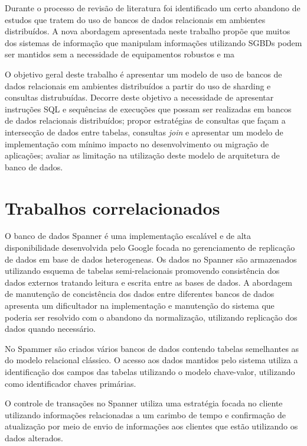\documentclass[12pt, a4paper]{article}
\begin{document}
Durante o processo de revisão de literatura foi identificado um certo abandono de estudos que tratem
do uso de bancos de dados relacionais em ambientes distribuídos. A nova abordagem apresentada neste
trabalho propõe que muitos dos sistemas de informação que manipulam informações utilizando SGBDs podem
ser mantidos sem a necessidade de equipamentos robustos e ma

O objetivo geral deste trabalho é apresentar um modelo de uso de bancos de dados relacionais em ambientes distribuídos a 
partir do uso de sharding e consultas distrubuídas. Decorre deste objetivo a necessidade de apresentar instruções SQL e 
sequências de execuções que possam ser realizadas em bancos de dados relacionais distribuídos; propor estratégias 
de consultas que façam a intersecção de dados entre tabelas, consultas \textit{join} e apresentar
um modelo de implementação com mínimo impacto no desenvolvimento ou migração de aplicações;
avaliar as limitação na utilização deste modelo de arquitetura de banco de dados.



\section{Trabalhos correlacionados}

O banco de dados Spanner é uma implementação escalável e de alta disponibilidade desenvolvida pelo Google
focada no gerenciamento de replicação de dados em base de dados heterogeneas. Os dados no Spanner são
armazenados utilizando esquema de tabelas semi-relacionais promovendo consistência dos dados externos tratando
leitura e escrita entre as bases de dados\cite{corbett2013spanner}. A abordagem de manutenção de concistência
dos dados entre diferentes bancos de dados apresenta um dificultador na implementação e manutenção do
sistema que poderia ser resolvido com o abandono da normalização, utilizando replicação dos dados 
quando necessário.

No Spammer são criados vários bancos de dados contendo tabelas semelhantes as do modelo relacional
clássico. O acesso aos dados mantidos pelo sistema utiliza a identificação dos campos das tabelas 
utilizando o modelo chave-valor, utilizando como identificador chaves primárias. 

O controle de transações no Spanner utiliza uma estratégia focada no cliente utilizando informações 
relacionadas a um carimbo de tempo e confirmação de atualização por meio de envio de informações
aos clientes que estão utilizando os dados alterados.
\end{document}
